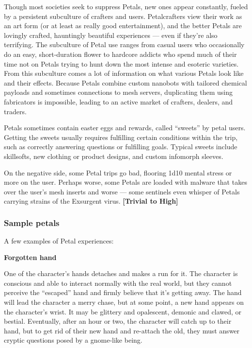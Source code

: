 Though most societies seek to suppress Petals, new ones appear constantly, fueled by a persistent subculture of crafters and users. Petalcrafters view their work as an art form (or at least as really good entertainment), and the better Petals are lovingly crafted, hauntingly beautiful experiences --- even if they’re also terrifying. The subculture of Petal use ranges from casual users who occasionally do an easy, short-duration flower to hardcore addicts who spend much of their time not on Petals trying to hunt down the most intense and esoteric varieties. From this subculture comes a lot of information on what various Petals look like and their effects. Because Petals combine custom nanobots with tailored chemical payloads and sometimes connections to mesh servers, duplicating them using fabricators is impossible, leading to an active market of crafters, dealers, and traders. 

Petals sometimes contain easter eggs and rewards, called ``sweets'' by petal users. Getting the sweets usually requires fulfilling certain conditions within the trip, such as correctly answering questions or fulfilling goals. Typical sweets include skillsofts, new clothing or product designs, and custom infomorph sleeves. 

On the negative side, some Petal trips go bad, flooring 1d10 mental stress or more on the user. Perhaps worse, some Petals are loaded with malware that takes over the user’s mesh inserts and worse --- some sentinels even whisper of Petals carrying strains of the Exsurgent virus. \textbf{[Trivial to High]} 

\subsubsection{Sample petals} 

A few examples of Petal experiences: 

\textbf{Forgotten hand} 

One of the character’s hands detaches and makes a run for it. The character is conscious and able to interact normally with the real world, but they cannot perceive the ``escaped'' hand and firmly believe that it’s getting away. The hand will lead the character a merry chase, but at some point, a new hand appears on the character’s wrist. It may be glittery and opalescent, demonic and clawed, or bestial. Eventually, after an hour or two, the character will catch up to their hand, but to get rid of their new hand and re-attach the old, they must answer cryptic questions posed by a gnome-like being. 

